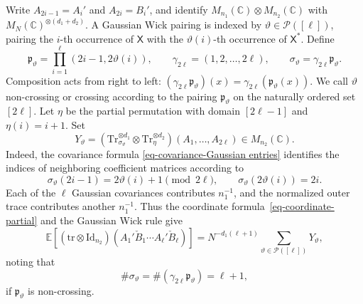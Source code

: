 \documentclass[12pt]{article}
\numberwithin{equation}{section}
\theoremstyle{plain}
\def\bE{\mathbb E}
\def\bC{\mathbb C}
\def\cP{\mathcal P}
\def\id{\mathrm {Id}}
\def\Tr{\mathrm {Tr}}
\def\tr{\mathrm {tr}}
\begin{document}
Write $A_{2i-1}=A_i'$ and $A_{2i}=B_i'$, and identify $M_{n_1}(\bC)\otimes M_{n_2}(\bC)$ with $M_N(\bC)^{\otimes(d_1+d_2)}$. A Gaussian Wick pairing is indexed by $\vartheta\in\cP([\ell])$, pairing the $i$-th occurrence of $\mathsf X$ with the $\vartheta(i)$-th occurrence of $\mathsf X^*$. Define
\[
\mathfrak p_\vartheta=\prod_{i=1}^\ell(2i-1,2\vartheta(i)),\qquad
\gamma_{2\ell}=(1,2,\ldots,2\ell),\qquad \sigma_\vartheta=\gamma_{2\ell} \mathfrak p_\vartheta.
\]
Composition acts from right to left: $(\gamma_{2\ell}\mathfrak p_\vartheta)(x)=\gamma_{2\ell}(\mathfrak p_\vartheta(x))$. We call $\vartheta$ non-crossing or crossing according to the pairing $\mathfrak p_\vartheta$ on the naturally ordered set $[2\ell]$. Let $\eta$ be the partial permutation with domain $[2\ell-1]$ and $\eta(i)=i+1$. Set
\[
Y_\vartheta=\left(\Tr_{\sigma_\vartheta}^{\otimes d_1}\otimes\Tr_\eta^{\otimes d_2}\right)(A_1,\ldots,A_{2\ell})\in M_{n_2}(\bC).
\]
Indeed, the covariance formula \eqref{eq-covariance-Gaussian entries} identifies the indices of neighboring coefficient matrices according to
\[
\sigma_\vartheta(2i-1)=2\vartheta(i)+1\pmod{2\ell},\qquad
\sigma_\vartheta(2\vartheta(i))=2i.
\]
Each of the $\ell$ Gaussian covariances contributes $n_1^{-1}$, and the normalized outer trace contributes another $n_1^{-1}$. Thus the coordinate formula~\eqref{eq-coordinate-partial} and the Gaussian Wick rule give
\begin{equation}\label{eq-Weingarten-1}
\bE[(\tr\otimes\id_{n_2})(A_1'\check B_1\cdots A_\ell'\check B_\ell)]
=N^{-d_1(\ell+1)}\sum_{\vartheta\in\cP([\ell])}Y_\vartheta,
\end{equation}
noting that
\begin{equation}\label{eq-Ginibre-noncrossing-cycles}
\#\sigma_\vartheta = \#(\gamma_{2\ell} \mathfrak p_\vartheta)=\ell+1,
\end{equation}
if $\mathfrak p_\vartheta$ is non-crossing.
\end{document}
